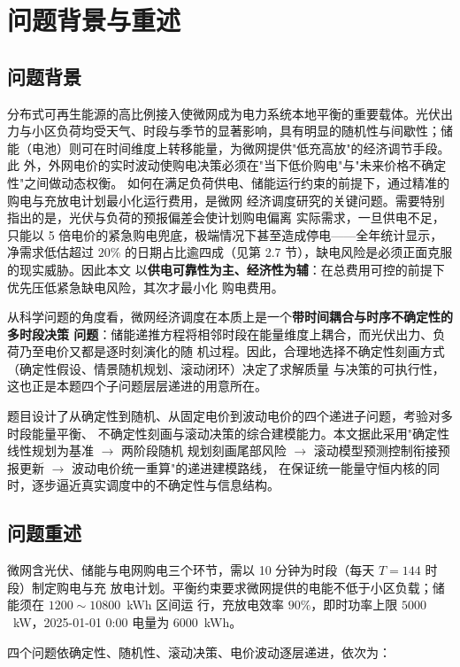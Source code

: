 \documentclass[withoutpreface]{cumcmthesis}
\begin{document}
\section{问题背景与重述}
\subsection{问题背景}
分布式可再生能源的高比例接入使微网成为电力系统本地平衡的重要载体\cite{cn:microgrid}。光伏出
力与小区负荷均受天气、时段与季节的显著影响，具有明显的随机性与间歇性\cite{cn:microgrid2}；储
能（电池）则可在时间维度上转移能量，为微网提供"低充高放"的经济调节手段\cite{cn:energy}。此
外，外网电价的实时波动使购电决策必须在"当下低价购电"与"未来价格不确定性"之间做动态权衡。
如何在满足负荷供电、储能运行约束的前提下，通过精准的购电与充放电计划最小化运行费用，是微网
经济调度研究的关键问题\cite{cn:forecast}。需要特别指出的是，光伏与负荷的预报偏差会使计划购电偏离
实际需求，一旦供电不足，只能以 5 倍电价的紧急购电兜底，极端情况下甚至造成停电——全年统计显示，
净需求低估超过 $20\%$ 的日期占比逾四成（见第 2.7 节），缺电风险是必须正面克服的现实威胁。因此本文
以\textbf{供电可靠性为主、经济性为辅}：在总费用可控的前提下优先压低紧急缺电风险，其次才最小化
购电费用。

从科学问题的角度看，微网经济调度在本质上是一个\textbf{带时间耦合与时序不确定性的多时段决策
问题}：储能递推方程将相邻时段在能量维度上耦合，而光伏出力、负荷乃至电价又都是逐时刻演化的随
机过程。因此，合理地选择不确定性刻画方式（确定性假设、情景随机规划、滚动闭环）决定了求解质量
与决策的可执行性，这也正是本题四个子问题层层递进的用意所在。

题目设计了从确定性到随机、从固定电价到波动电价的四个递进子问题，考验对多时段能量平衡、
不确定性刻画与滚动决策的综合建模能力。本文据此采用"确定性线性规划为基准 $\to$ 两阶段随机
规划刻画尾部风险 $\to$ 滚动模型预测控制衔接预报更新 $\to$ 波动电价统一重算"的递进建模路线，
在保证统一能量守恒内核的同时，逐步逼近真实调度中的不确定性与信息结构。

\subsection{问题重述}
微网含光伏、储能与电网购电三个环节，需以 10 分钟为时段（每天 $T=144$ 时段）制定购电与充
放电计划。平衡约束要求微网提供的电能不低于小区负载；储能须在 $1200\sim10800$~kWh 区间运
行，充放电效率 $90\%$，即时功率上限 $5000$~kW，2025-01-01 0:00 电量为 $6000$~kWh。

四个问题依确定性、随机性、滚动决策、电价波动逐层递进，依次为：
\end{document}
